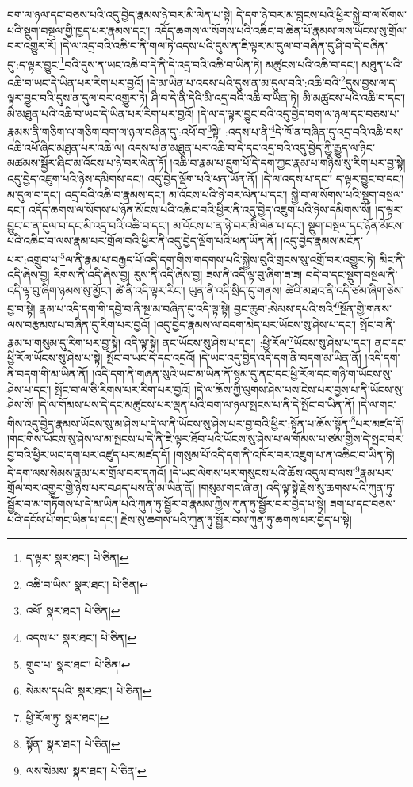 བག་ལ་ཉལ་དང་བཅས་པའི་འདུ་བྱེད་རྣམས་ཉེ་བར་མི་ལེན་པ་སྟེ། དེ་དག་ཉེ་བར་མ་བླངས་པའི་ཕྱིར་སྐྱེ་བ་ལ་སོགས་པའི་སྡུག་བསྔལ་གྱི་ཁྱད་པར་རྣམས་དང་། འདོད་ཆགས་ལ་སོགས་པའི་འཆིང་བ་ཆེན་པོ་རྣམས་ལས་ཡོངས་སུ་གྲོལ་བར་འགྱུར་རོ། །དེ་ལ་འདྲ་བའི་འཆི་བ་ནི་གལ་ཏེ་འདས་པའི་དུས་ན་ཇི་ལྟར་མ་དུལ་བ་བཞིན་དུ་ཤི་བ་དེ་བཞིན་དུ་:ད་ལྟར་བྱུང་\footnote{ད་ལྟར་  སྣར་ཐང་།  པེ་ཅིན། }བའི་དུས་ན་ཡང་འཆི་བ་དེ་ནི་དེ་འདྲ་བའི་འཆི་བ་ཡིན་ཏེ། མཚུངས་པའི་འཆི་བ་དང་། མཐུན་པའི་འཆི་བ་ཡང་དེ་ཡིན་པར་རིག་པར་བྱའོ། །དེ་མ་ཡིན་པ་འདས་པའི་དུས་ན་མ་དུལ་བའི་:འཆི་བའི་\footnote{འཆི་བ་ཡིས་  སྣར་ཐང་།  པེ་ཅིན། }དུས་བྱས་ལ་ད་ལྟར་བྱུང་བའི་དུས་ན་དུལ་བར་འགྱུར་ཏེ། ཤི་བ་དེ་ནི་དེའི་མི་འདྲ་བའི་འཆི་བ་ཡིན་ཏེ། མི་མཚུངས་པའི་འཆི་བ་དང་། མི་མཐུན་པའི་འཆི་བ་ཡང་དེ་ཡིན་པར་རིག་པར་བྱའོ། །དེ་ལ་ད་ལྟར་བྱུང་བའི་འདུ་བྱེད་བག་ལ་ཉལ་དང་བཅས་པ་རྣམས་ནི་གཅིག་ལ་གཅིག་བག་ལ་ཉལ་བཞིན་དུ་:འཕོ་བ་\footnote{འཕོ་  སྣར་ཐང་།  པེ་ཅིན། }སྟེ། :འདས་པ་ནི་\footnote{འདས་པ་  སྣར་ཐང་།  པེ་ཅིན། }དེ་ཁོ་ན་བཞིན་དུ་འདྲ་བའི་འཆི་བས་འཆི་འཕོ་ཞིང་མཐུན་པར་འཆི་ལ། འདས་པ་ན་མཐུན་པར་འཆི་བ་དེ་དང་འདྲ་བའི་འདུ་བྱེད་ཀྱི་རྒྱུད་ལ་ཉིང་མཚམས་སྦྱོར་ཞིང་མ་འོངས་པ་ཉེ་བར་ལེན་ཏོ། །འཆི་བ་རྣམ་པ་དྲུག་པོ་དེ་དག་ཀྱང་རྣམ་པ་གཉིས་སུ་རིག་པར་བྱ་སྟེ། འདུ་བྱེད་འཇུག་པའི་ཉེས་དམིགས་དང་། འདུ་བྱེད་ལྡོག་པའི་ཕན་ཡོན་ནོ། །དེ་ལ་འདས་པ་དང་། ད་ལྟར་བྱུང་བ་དང་། མ་དུལ་བ་དང་། འདྲ་བའི་འཆི་བ་རྣམས་དང་། མ་འོངས་པའི་ཉེ་བར་ལེན་པ་དང་། སྐྱེ་བ་ལ་སོགས་པའི་སྡུག་བསྔལ་དང་། འདོད་ཆགས་ལ་སོགས་པ་ཉོན་མོངས་པའི་འཆིང་བའི་ཕྱིར་ནི་འདུ་བྱེད་འཇུག་པའི་ཉེས་དམིགས་སོ། །ད་ལྟར་བྱུང་བ་ན་དུལ་བ་དང་མི་འདྲ་བའི་འཆི་བ་དང་། མ་འོངས་པ་ན་ཉེ་བར་མི་ལེན་པ་དང་། སྡུག་བསྔལ་དང་ཉོན་མོངས་པའི་འཆིང་བ་ལས་རྣམ་པར་གྲོལ་བའི་ཕྱིར་ནི་འདུ་བྱེད་ལྡོག་པའི་ཕན་ཡོན་ནོ། །འདུ་བྱེད་རྣམས་མངོན་པར་:འགྲུབ་པ་\footnote{གྲུབ་པ་  སྣར་ཐང་།  པེ་ཅིན། }ལ་ནི་རྣམ་པ་བརྒྱད་པོ་འདི་དག་གིས་གདགས་པའི་སྐྱེས་བུའི་གྲངས་སུ་འགྲོ་བར་འགྱུར་ཏེ། མིང་ནི་འདི་ཞེས་བྱ། རིགས་ནི་འདི་ཞེས་བྱ། རུས་ནི་འདི་ཞེས་བྱ། ཟས་ནི་འདི་ལྟ་བུ་ཞིག་ཟ་ཟ། བདེ་བ་དང་སྡུག་བསྔལ་ནི་འདི་ལྟ་བུ་ཞིག་ཉམས་སུ་མྱོང་། ཚེ་ནི་འདི་ལྟར་རིང་། ཡུན་ནི་འདི་སྲིད་དུ་གནས། ཚེའི་མཐའ་ནི་འདི་ཙམ་ཞིག་ཅེས་བྱ་བ་སྟེ། རྣམ་པ་འདི་དག་གི་དབྱེ་བ་ནི་སྔ་མ་བཞིན་དུ་འདི་ལྟ་སྟེ། བྱང་ཆུབ་:སེམས་དཔའི་སའི་\footnote{སེམས་དཔའི་  སྣར་ཐང་།  པེ་ཅིན། }སྔོན་གྱི་གནས་ལས་བརྩམས་པ་བཞིན་དུ་རིག་པར་བྱའོ། །འདུ་བྱེད་རྣམས་ལ་བདག་མེད་པར་ཡོངས་སུ་ཤེས་པ་དང་། སྤོང་བ་ནི་རྣམ་པ་གསུམ་དུ་རིག་པར་བྱ་སྟེ། འདི་ལྟ་སྟེ། ནང་ཡོངས་སུ་ཤེས་པ་དང་། :ཕྱི་རོལ་\footnote{ཕྱི་རོལ་ཏུ་  སྣར་ཐང་། }ཡོངས་སུ་ཤེས་པ་དང་། ནང་དང་ཕྱི་རོལ་ཡོངས་སུ་ཤེས་པ་སྟེ། སྤོང་བ་ཡང་དེ་དང་འདྲའོ། །དེ་ཡང་འདུ་བྱེད་འདི་དག་ནི་བདག་མ་ཡིན་ནོ། །འདི་དག་ནི་བདག་གི་མ་ཡིན་ནོ། །འདི་དག་ནི་གཞན་སུའི་ཡང་མ་ཡིན་ནོ་སྙམ་དུ་ནང་དང་ཕྱི་རོལ་དང་གཉི་ག་ཡོངས་སུ་ཤེས་པ་དང་། སྤོང་བ་ལ་ཅི་རིགས་པར་རིག་པར་བྱའོ། །དེ་ལ་ཆོས་ཀྱི་ལུགས་ཤེས་པས་ངེས་པར་བྱས་པ་ནི་ཡོངས་སུ་ཤེས་སོ། །དེ་ལ་གོམས་པས་དེ་དང་མཚུངས་པར་ལྡན་པའི་བག་ལ་ཉལ་སྤངས་པ་ནི་དེ་སྤོང་བ་ཡིན་ནོ། །དེ་ལ་གང་གིས་འདུ་བྱེད་རྣམས་ཡོངས་སུ་མ་ཤེས་པ་དེ་ལ་ནི་ཡོངས་སུ་ཤེས་པར་བྱ་བའི་ཕྱིར་:སྟོན་པ་ཆོས་སྟོན་\footnote{སྟོན་  སྣར་ཐང་།  པེ་ཅིན། }པར་མཛད་དོ། །གང་གིས་ཡོངས་སུ་ཤེས་ལ་མ་སྤངས་པ་དེ་ནི་ཇི་ལྟར་ཐོབ་པའི་ཡོངས་སུ་ཤེས་པ་ལ་གོམས་པ་ཙམ་གྱིས་དེ་སྤང་བར་བྱ་བའི་ཕྱིར་ཡང་དག་པར་འཛུད་པར་མཛད་དོ། །གསུམ་པོ་འདི་དག་ནི་འཁོར་བར་འཇུག་པ་ན་འཆིང་བ་ཡིན་ཏེ། དེ་དག་ལས་སེམས་རྣམ་པར་གྲོལ་བར་དཀའོ། །དེ་ཡང་ལེགས་པར་གསུངས་པའི་ཆོས་འདུལ་བ་ལས་\footnote{ལས་སེམས་  སྣར་ཐང་།  པེ་ཅིན། }རྣམ་པར་གྲོལ་བར་འགྱུར་གྱི་ཉེས་པར་བཤད་པས་ནི་མ་ཡིན་ནོ། །གསུམ་གང་ཞེ་ན། འདི་ལྟ་སྟེ་རྗེས་སུ་ཆགས་པའི་ཀུན་ཏུ་སྦྱོར་བ་མ་གཏོགས་པ་དེ་མ་ཡིན་པའི་ཀུན་ཏུ་སྦྱོར་བ་རྣམས་ཀྱིས་ཀུན་ཏུ་སྦྱོར་བར་བྱེད་པ་སྟེ། ཟག་པ་དང་བཅས་པའི་དངོས་པོ་གང་ཡིན་པ་དང་། རྗེས་སུ་ཆགས་པའི་ཀུན་ཏུ་སྦྱོར་བས་ཀུན་ཏུ་ཆགས་པར་བྱེད་པ་སྟེ། 